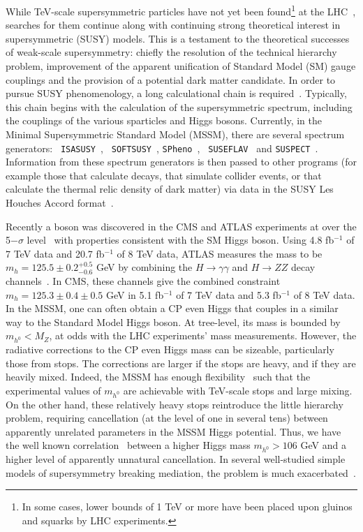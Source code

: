 \documentclass[final,3p,times,pdflatex]{elsarticle}
\begin{document}
While TeV-scale supersymmetric particles have not yet been found\footnote{In some
  cases, lower   bounds of 1 
TeV or more have been placed upon gluinos and squarks by LHC experiments.}
at the LHC~\cite{Aad:2013wta,CMSspart}, searches for them continue along with
continuing strong theoretical interest in supersymmetric (SUSY) models. 
This is a
testament to the 
theoretical successes of weak-scale supersymmetry: chiefly the resolution of
the technical hierarchy problem, improvement of the apparent unification of Standard
Model (SM) gauge couplings and the provision of a potential 
dark matter candidate. 
In order to pursue SUSY phenomenology, a long calculational chain is
required~\cite{Allanach:2008zn}. Typically, this chain begins with the
calculation of the 
supersymmetric spectrum, including the couplings of the various sparticles and
Higgs bosons. Currently, in the Minimal Supersymmetric Standard Model (MSSM), there
are several spectrum generators: {\tt
  ISASUSY}~\cite{Baer:1993ae}, {\tt 
  SOFTSUSY}~\cite{Allanach:2001kg}, {\tt   SPheno}~\cite{Porod:2003um}, {\tt
  SUSEFLAV}~\cite{Chowdhury:2011zr} and {\tt SUSPECT}~\cite{Djouadi:2002ze}. 
Information from these spectrum generators is then passed to other programs
(for example those that calculate decays, that simulate collider events, or
that calculate the thermal relic density of dark matter) via data in the SUSY
Les Houches Accord format~\cite{Skands:2003cj}.

Recently a boson was discovered in the CMS and 
ATLAS experiments at over the 5$-\sigma$
level~\cite{Aad:2012tfa,Chatrchyan:2012ufa} with properties consistent
with the SM Higgs boson. Using 4.8 fb$^{-1}$ of 7 TeV data and 20.7
fb$^{-1}$ of 8 TeV data, ATLAS measures the mass to be
$m_h=125.5\pm0.2^{+0.5}_{-0.6}$ GeV by combining the $H \rightarrow \gamma
\gamma$ and $H \rightarrow ZZ$ decay channels~\cite{ATLAS-CONF-2013-014}.
In CMS, these channels give the combined constraint $m_h=125.3 \pm0.4 \pm0.5$
GeV in 5.1 fb$^{-1}$ of 7 TeV data and 5.3 fb$^{-1}$ of 8 TeV data. 
In the MSSM, one can often obtain a CP even Higgs that couples in a similar
way to the Standard Model Higgs boson. At tree-level, its mass is bounded by
$m_{h^0} < M_Z$, at odds with the LHC experiments' mass measurements. 
However,
the radiative corrections to the CP even Higgs mass can be sizeable,
particularly those from stops. The corrections are larger if the stops are
heavy, and if they are heavily mixed. Indeed, the MSSM has enough
flexibility~\cite{Djouadi:2013lra} such that the experimental values of
$m_{h^0}$ are achievable with TeV-scale stops and large mixing. On the other
hand, these relatively heavy stops reintroduce the little hierarchy problem,
requiring cancellation (at the level of one in several tens) 
between apparently unrelated parameters in the MSSM Higgs potential. 
Thus, we have the well known correlation~\cite{Barbieri:1998uv} between a
higher Higgs mass $m_{h^0}>106$ GeV and a higher level of apparently unnatural
cancellation. In several
well-studied simple models of supersymmetry breaking mediation, the
problem is much exacerbated~\cite{Arbey:2011ab}. 
\end{document}

